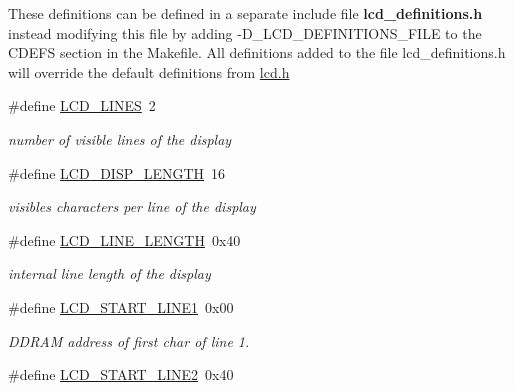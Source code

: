 These definitions can be defined in a separate include file {\bfseries lcd\+\_\+definitions.\+h} instead modifying this file by adding -\/\+D\+\_\+\+L\+C\+D\+\_\+\+D\+E\+F\+I\+N\+I\+T\+I\+O\+N\+S\+\_\+\+F\+I\+LE to the C\+D\+E\+FS section in the Makefile. All definitions added to the file lcd\+\_\+definitions.\+h will override the default definitions from \hyperlink{lcd_8h}{lcd.\+h} \begin{DoxyCompactItemize}
\item 
\#define \hyperlink{group__pfleury__lcd_ga01212e90283511562039db786f65ba98}{L\+C\+D\+\_\+\+L\+I\+N\+ES}~2\hypertarget{group__pfleury__lcd_ga01212e90283511562039db786f65ba98}{}\label{group__pfleury__lcd_ga01212e90283511562039db786f65ba98}

\begin{DoxyCompactList}\small\item\em number of visible lines of the display \end{DoxyCompactList}\item 
\#define \hyperlink{group__pfleury__lcd_ga684bb4392e384b7ae7c660d81dacb930}{L\+C\+D\+\_\+\+D\+I\+S\+P\+\_\+\+L\+E\+N\+G\+TH}~16\hypertarget{group__pfleury__lcd_ga684bb4392e384b7ae7c660d81dacb930}{}\label{group__pfleury__lcd_ga684bb4392e384b7ae7c660d81dacb930}

\begin{DoxyCompactList}\small\item\em visibles characters per line of the display \end{DoxyCompactList}\item 
\#define \hyperlink{group__pfleury__lcd_gae59a728d9dee9f12c817b29d38746ed9}{L\+C\+D\+\_\+\+L\+I\+N\+E\+\_\+\+L\+E\+N\+G\+TH}~0x40\hypertarget{group__pfleury__lcd_gae59a728d9dee9f12c817b29d38746ed9}{}\label{group__pfleury__lcd_gae59a728d9dee9f12c817b29d38746ed9}

\begin{DoxyCompactList}\small\item\em internal line length of the display \end{DoxyCompactList}\item 
\#define \hyperlink{group__pfleury__lcd_gabd056d70a1488ea2eb1aef87e248e234}{L\+C\+D\+\_\+\+S\+T\+A\+R\+T\+\_\+\+L\+I\+N\+E1}~0x00\hypertarget{group__pfleury__lcd_gabd056d70a1488ea2eb1aef87e248e234}{}\label{group__pfleury__lcd_gabd056d70a1488ea2eb1aef87e248e234}

\begin{DoxyCompactList}\small\item\em D\+D\+R\+AM address of first char of line 1. \end{DoxyCompactList}\item 
\#define \hyperlink{group__pfleury__lcd_ga7b317b21058ef031716ba040ef75430a}{L\+C\+D\+\_\+\+S\+T\+A\+R\+T\+\_\+\+L\+I\+N\+E2}~0x40\hypertarget{group__pfleury__lcd_ga7b317b21058ef031716ba040ef75430a}{}\label{group__pfleury__lcd_ga7b317b21058ef031716ba040ef75430a}


\end{DoxyCompactItemize}
